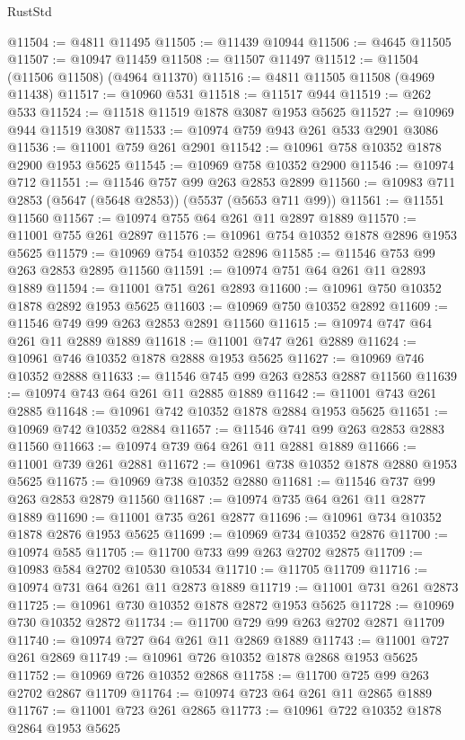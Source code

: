 \begin{lexlean}{RustStd}
\begin{coremodule}
@11504 := @4811 @11495
@11505 := @11439 @10944
@11506 := @4645 @11505
@11507 := @10947 @11459
@11508 := @11507 @11497
@11512 := @11504 (@11506 @11508) (@4964 @11370)
@11516 := @4811 @11505 @11508 (@4969 @11438)
@11517 := @10960 @531
@11518 := @11517 @944
@11519 := @262 @533
@11524 := @11518 @11519 @1878 @3087 @1953 @5625
@11527 := @10969 @944 @11519 @3087
@11533 := @10974 @759 @943 @261 @533 @2901 @3086
@11536 := @11001 @759 @261 @2901
@11542 := @10961 @758 @10352 @1878 @2900 @1953 @5625
@11545 := @10969 @758 @10352 @2900
@11546 := @10974 @712
@11551 := @11546 @757 @99 @263 @2853 @2899
@11560 := @10983 @711 @2853 (@5647 (@5648 @2853)) (@5537 (@5653 @711 @99))
@11561 := @11551 @11560
@11567 := @10974 @755 @64 @261 @11 @2897 @1889
@11570 := @11001 @755 @261 @2897
@11576 := @10961 @754 @10352 @1878 @2896 @1953 @5625
@11579 := @10969 @754 @10352 @2896
@11585 := @11546 @753 @99 @263 @2853 @2895 @11560
@11591 := @10974 @751 @64 @261 @11 @2893 @1889
@11594 := @11001 @751 @261 @2893
@11600 := @10961 @750 @10352 @1878 @2892 @1953 @5625
@11603 := @10969 @750 @10352 @2892
@11609 := @11546 @749 @99 @263 @2853 @2891 @11560
@11615 := @10974 @747 @64 @261 @11 @2889 @1889
@11618 := @11001 @747 @261 @2889
@11624 := @10961 @746 @10352 @1878 @2888 @1953 @5625
@11627 := @10969 @746 @10352 @2888
@11633 := @11546 @745 @99 @263 @2853 @2887 @11560
@11639 := @10974 @743 @64 @261 @11 @2885 @1889
@11642 := @11001 @743 @261 @2885
@11648 := @10961 @742 @10352 @1878 @2884 @1953 @5625
@11651 := @10969 @742 @10352 @2884
@11657 := @11546 @741 @99 @263 @2853 @2883 @11560
@11663 := @10974 @739 @64 @261 @11 @2881 @1889
@11666 := @11001 @739 @261 @2881
@11672 := @10961 @738 @10352 @1878 @2880 @1953 @5625
@11675 := @10969 @738 @10352 @2880
@11681 := @11546 @737 @99 @263 @2853 @2879 @11560
@11687 := @10974 @735 @64 @261 @11 @2877 @1889
@11690 := @11001 @735 @261 @2877
@11696 := @10961 @734 @10352 @1878 @2876 @1953 @5625
@11699 := @10969 @734 @10352 @2876
@11700 := @10974 @585
@11705 := @11700 @733 @99 @263 @2702 @2875
@11709 := @10983 @584 @2702 @10530 @10534
@11710 := @11705 @11709
@11716 := @10974 @731 @64 @261 @11 @2873 @1889
@11719 := @11001 @731 @261 @2873
@11725 := @10961 @730 @10352 @1878 @2872 @1953 @5625
@11728 := @10969 @730 @10352 @2872
@11734 := @11700 @729 @99 @263 @2702 @2871 @11709
@11740 := @10974 @727 @64 @261 @11 @2869 @1889
@11743 := @11001 @727 @261 @2869
@11749 := @10961 @726 @10352 @1878 @2868 @1953 @5625
@11752 := @10969 @726 @10352 @2868
@11758 := @11700 @725 @99 @263 @2702 @2867 @11709
@11764 := @10974 @723 @64 @261 @11 @2865 @1889
@11767 := @11001 @723 @261 @2865
@11773 := @10961 @722 @10352 @1878 @2864 @1953 @5625

\end{coremodule}
\end{lexlean}
